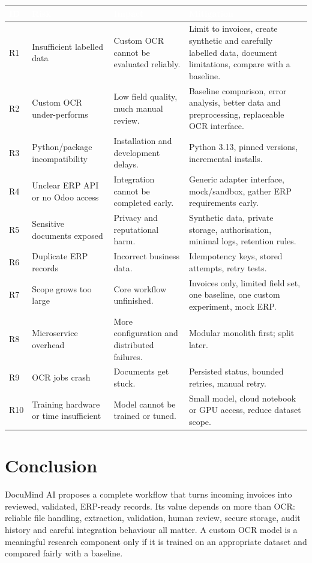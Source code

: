 \documentclass[11pt,a4paper]{report}
\newcommand{\projname}{DocuMind AI}
\newcommand{\hdr}[1]{\textcolor{white}{\sffamily\bfseries #1}}
\newcommand{\tblstart}{\rowcolors{2}{white}{rowgray}\arrayrulecolor{teal!60}}
\newcommand{\hdrrow}{\rowcolor{navy}}
\begin{document}
{\tblstart\small
\begin{longtable}{L{0.9cm}L{3.3cm}L{3.6cm}L{5.8cm}}
\hdrrow \hdr{ID} & \hdr{Risk} & \hdr{Impact} & \hdr{Mitigation}\\ \endhead
R1 & Insufficient labelled data & Custom OCR cannot be evaluated reliably. & Limit to invoices, create synthetic and carefully labelled data, document limitations, compare with a baseline.\\
R2 & Custom OCR under-performs & Low field quality, much manual review. & Baseline comparison, error analysis, better data and preprocessing, replaceable OCR interface.\\
R3 & Python/package incompatibility & Installation and development delays. & Python 3.13, pinned versions, incremental installs.\\
R4 & Unclear ERP API or no Odoo access & Integration cannot be completed early. & Generic adapter interface, mock/sandbox, gather ERP requirements early.\\
R5 & Sensitive documents exposed & Privacy and reputational harm. & Synthetic data, private storage, authorisation, minimal logs, retention rules.\\
R6 & Duplicate ERP records & Incorrect business data. & Idempotency keys, stored attempts, retry tests.\\
R7 & Scope grows too large & Core workflow unfinished. & Invoices only, limited field set, one baseline, one custom experiment, mock ERP.\\
R8 & Microservice overhead & More configuration and distributed failures. & Modular monolith first; split later.\\
R9 & OCR jobs crash & Documents get stuck. & Persisted status, bounded retries, manual retry.\\
R10 & Training hardware or time insufficient & Model cannot be trained or tuned. & Small model, cloud notebook or GPU access, reduce dataset scope.\\
\hline
\end{longtable}}

\chapter{Conclusion}
\projname{} proposes a complete workflow that turns incoming invoices into reviewed, validated, ERP-ready records. Its value depends on more than OCR: reliable file handling, extraction, validation, human review, secure storage, audit history and careful integration behaviour all matter. A custom OCR model is a meaningful research component only if it is trained on an appropriate dataset and compared fairly with a baseline.
\end{document}
